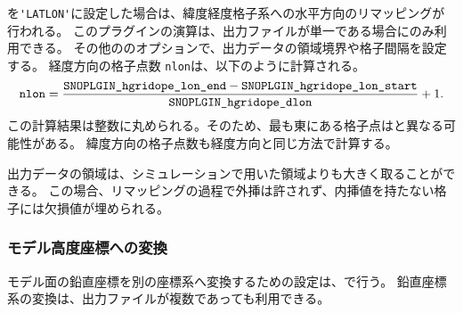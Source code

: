 を\verb|'LATLON'|に設定した場合は、緯度経度格子系への水平方向のリマッピングが行われる。
このプラグインの演算は、出力ファイルが単一である場合にのみ利用できる。
その他ののオプションで、出力データの領域境界や格子間隔を設定する。
経度方向の格子点数 \verb|nlon|は、以下のように計算される。
\begin{eqnarray}
  \nmitemeq{nlon} = \frac{\nmitemeq{SNOPLGIN_hgridope_lon_end} - \nmitemeq{SNOPLGIN_hgridope_lon_start} }{\nmitemeq{SNOPLGIN_hgridope_dlon}} + 1\nonumber.
\end{eqnarray}
\noindent
この計算結果は整数に丸められる。そのため、最も東にある格子点はと異なる可能性がある。
緯度方向の格子点数も経度方向と同じ方法で計算する。

出力データの領域は、シミュレーションで用いた領域よりも大きく取ることができる。
この場合、リマッピングの過程で外挿は許されず、内挿値を持たない格子には欠損値が埋められる。


\subsubsection{モデル高度座標への変換}

モデル面の鉛直座標を別の座標系へ変換するための設定は、で行う。
鉛直座標系の変換は、出力ファイルが複数であっても利用できる。

%

